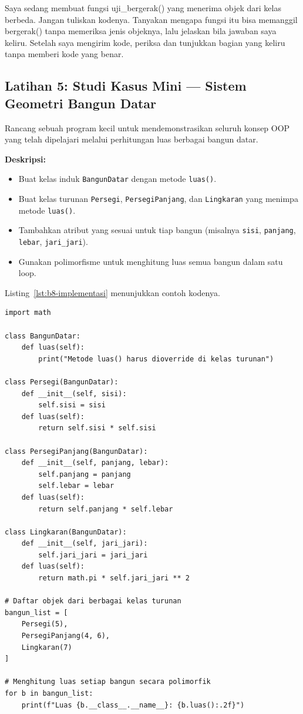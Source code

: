 \begin{promptterarah}
Saya sedang membuat fungsi uji\_bergerak() yang menerima objek dari kelas berbeda. Jangan tuliskan kodenya. Tanyakan mengapa fungsi itu bisa memanggil bergerak() tanpa memeriksa jenis objeknya, lalu jelaskan bila jawaban saya keliru. Setelah saya mengirim kode, periksa dan tunjukkan bagian yang keliru tanpa memberi kode yang benar.
\end{promptterarah}

\subsection*{Latihan 5: Studi Kasus Mini — Sistem Geometri Bangun Datar}

Rancang sebuah program kecil untuk mendemonstrasikan seluruh konsep OOP yang telah dipelajari melalui perhitungan luas berbagai bangun datar.

\textbf{Deskripsi:}
\begin{itemize}
    \item Buat kelas induk \texttt{BangunDatar} dengan metode \texttt{luas()}.
    \item Buat kelas turunan \texttt{Persegi}, \texttt{PersegiPanjang}, dan \texttt{Lingkaran} yang menimpa metode \texttt{luas()}.
    \item Tambahkan atribut yang sesuai untuk tiap bangun (misalnya \texttt{sisi}, \texttt{panjang}, \texttt{lebar}, \texttt{jari\_jari}).
    \item Gunakan polimorfisme untuk menghitung luas semua bangun dalam satu loop.
\end{itemize}

Listing~\ref{lst:b8-implementasi} menunjukkan contoh kodenya.

\begin{lstlisting}[style=PythonStyle, caption={Contoh Implementasi}, label={lst:b8-implementasi}]
import math

class BangunDatar:
    def luas(self):
        print("Metode luas() harus dioverride di kelas turunan")

class Persegi(BangunDatar):
    def __init__(self, sisi):
        self.sisi = sisi
    def luas(self):
        return self.sisi * self.sisi

class PersegiPanjang(BangunDatar):
    def __init__(self, panjang, lebar):
        self.panjang = panjang
        self.lebar = lebar
    def luas(self):
        return self.panjang * self.lebar

class Lingkaran(BangunDatar):
    def __init__(self, jari_jari):
        self.jari_jari = jari_jari
    def luas(self):
        return math.pi * self.jari_jari ** 2

# Daftar objek dari berbagai kelas turunan
bangun_list = [
    Persegi(5),
    PersegiPanjang(4, 6),
    Lingkaran(7)
]

# Menghitung luas setiap bangun secara polimorfik
for b in bangun_list:
    print(f"Luas {b.__class__.__name__}: {b.luas():.2f}")
\end{lstlisting}

